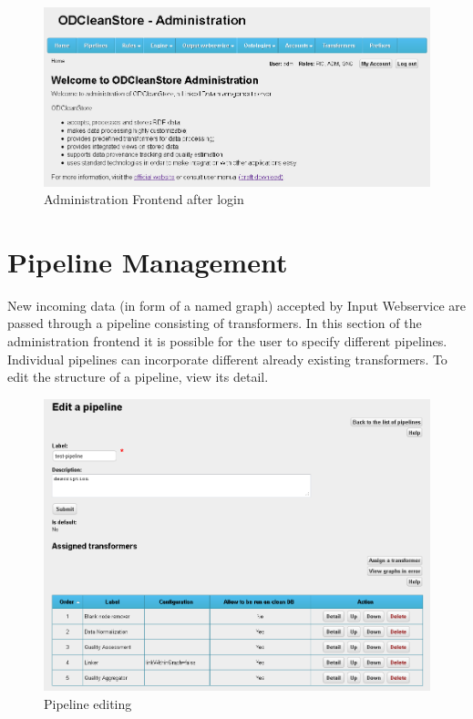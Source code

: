 \begin{figure}[tb]
    \centering
    \includegraphics[width=\textwidth]{images/fe-home-screenshot.png}
    \caption{Administration Frontend after login}
	\label{fig:feHome}
\end{figure}

\section{Pipeline Management}
\label{sec:pipelineManagement}

	New incoming data (in form of a named graph) accepted by Input Webservice are passed through a {pipeline} consisting of {transformers}. In this section of the administration frontend it is possible for the user to specify different {pipelines}. Individual {pipelines} can incorporate different already existing {transformers}. To edit the structure of a {pipeline}, view its detail.

\begin{figure}[tb]
    \centering
    \includegraphics[width=\textwidth]{images/fe-pipeline-screenshot.png}
    \caption{Pipeline editing}
	\label{fig:fePipelineEditing}
\end{figure}

